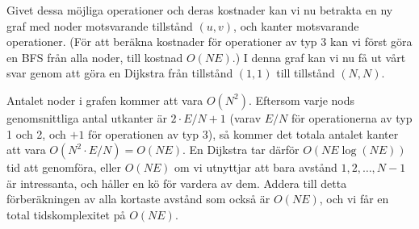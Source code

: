 Givet dessa möjliga operationer och deras kostnader kan vi nu betrakta en ny graf med noder motsvarande tillstånd $(u, v)$, och kanter motsvarande operationer.
(För att beräkna kostnader för operationer av typ 3 kan vi först göra en BFS från alla noder, till kostnad $O(NE)$.)
I denna graf kan vi nu få ut vårt svar genom att göra en Dijkstra från tillstånd $(1, 1)$ till tillstånd $(N, N)$.

Antalet noder i grafen kommer att vara $O(N^2)$. Eftersom varje nods genomsnittliga antal utkanter är $2\cdot E/N + 1$ (varav $E/N$ för operationerna av typ 1 och 2, och $+ 1$ för operationen av typ 3), så kommer det totala antalet kanter att vara $O(N^2 \cdot E / N) = O(NE)$.
En Dijkstra tar därför $O(NE \log(NE))$ tid att genomföra, eller $O(NE)$ om vi utnyttjar att bara avstånd $1, 2, \dots, N-1$ är intressanta, och håller en kö för vardera av dem.
Addera till detta förberäkningen av alla kortaste avstånd som också är $O(NE)$, och vi får en total tidskomplexitet på $O(NE)$.

